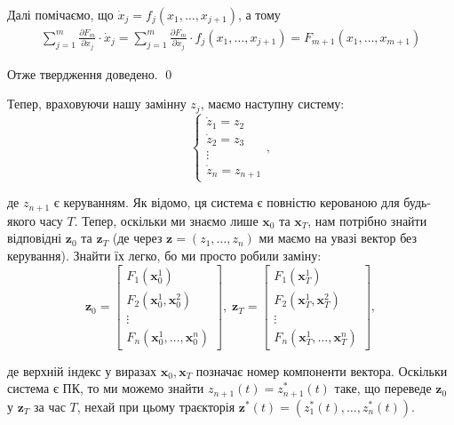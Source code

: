 \documentclass[oneside,solution]{karazin-control-assign}
\begin{document}
Далі помічаємо, що $\dot{x}_j=f_j(x_1,\dots,x_{j+1})$, а тому
\begin{gather}
    \sum_{j=1}^{m} \frac{\partial F_m}{\partial x_j} \cdot \dot{x}_j = \sum_{j=1}^m \frac{\partial F_m}{\partial x_j} \cdot f_j(x_1,\dots,x_{j+1}) = F_{m+1}(x_1,\dots,x_{m+1})
\end{gather}

Отже твердження доведено. \qed

Тепер, враховуючи нашу замінну $z_j$, маємо наступну систему:
\begin{equation}
    \begin{cases}
        \dot{z}_1 = z_2 \\
        \dot{z}_2 = z_3 \\
        \vdots \\
        \dot{z}_n = z_{n+1}
    \end{cases},
\end{equation}

де $z_{n+1}$ є керуванням. Як відомо, ця система є повністю керованою для будь-якого часу $T$. Тепер, оскільки ми знаємо лише $\mathbf{x}_0$ та $\mathbf{x}_T$, нам потрібно знайти відповідні $\mathbf{z}_0$ та $\mathbf{z}_T$ (де через $\mathbf{z}=(z_1,\dots,z_n)$ ми маємо на увазі вектор без керування). Знайти їх легко, бо ми просто робили заміну:
\begin{equation}
    \mathbf{z}_0 = \begin{bmatrix}
        F_1(\mathbf{x}_0^1) \\
        F_2(\mathbf{x}_0^1, \mathbf{x}_0^2) \\
        \vdots \\
        F_n(\mathbf{x}_0^1, \dots, \mathbf{x}_0^n) 
    \end{bmatrix}, \; \mathbf{z}_T =\begin{bmatrix}
        F_1(\mathbf{x}_T^1) \\
        F_2(\mathbf{x}_T^1, \mathbf{x}_T^2) \\
        \vdots \\
        F_n(\mathbf{x}_T^1, \dots, \mathbf{x}_T^n) 
    \end{bmatrix},
\end{equation}

де верхній індекс у виразах $\mathbf{x}_0,\mathbf{x}_T$ позначає номер компоненти вектора. Оскільки система є ПК, то ми можемо знайти $z_{n+1}(t) = z_{n+1}^*(t)$ таке, що переведе $\mathbf{z}_0$ у $\mathbf{z}_T$ за час $T$, нехай при цьому траєкторія $\mathbf{z}^*(t) = (z_1^*(t), \dots, z_n^*(t))$.
\end{document}
